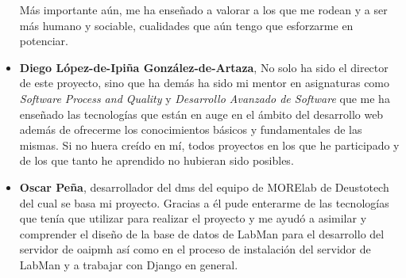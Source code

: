 \begin{itemize}
	Más importante aún, me ha enseñado a valorar a los que me rodean y a ser más humano y sociable, cualidades que aún tengo que esforzarme en potenciar.

	\item \textbf{Diego López-de-Ipiña González-de-Artaza}, No solo ha sido el director de este proyecto, sino que ha demás ha sido mi mentor en asignaturas como \textit{Software Process and Quality} y \textit{Desarrollo Avanzado de Software} que me ha enseñado las tecnologías que están en auge en el ámbito del desarrollo web además de ofrecerme los conocimientos básicos y fundamentales de las mismas. Si no huera creído en mí, todos proyectos en los que he participado y de los que tanto he aprendido no hubieran sido posibles.

	\item \textbf{Oscar Peña}, desarrollador del \acrshort{dms} del equipo de MORElab de Deustotech del cual se basa mi proyecto. Gracias a él pude enterarme de las tecnologías que tenía que utilizar para realizar el proyecto y me ayudó a asimilar y comprender el diseño de la base de datos de LabMan para el desarrollo del servidor de \acrshort{oaipmh} así como en el proceso de instalación del servidor de LabMan y a trabajar con Django en general.

\end{itemize}